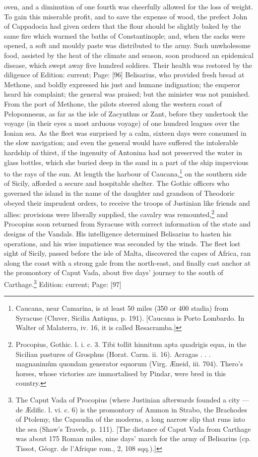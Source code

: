 oven, and a diminution of one fourth was cheerfully allowed for the loss of weight. To gain this miserable profit, and to save the expense of wood, the prefect John of Cappadocia had given orders that the flour should be slightly baked by the same fire which warmed the baths of Constantinople; and, when the sacks were opened, a soft and mouldy paste was distributed to the army. Such unwholesome food, assisted by the heat of the climate and season, soon produced an epidemical disease, which swept away five hundred soldiers. Their health was restored by the diligence of Edition: current; Page: [96] Belisarius, who provided fresh bread at Methone, and boldly expressed his just and humane indignation; the emperor heard his complaint; the general was praised; but the minister was not punished. From the port of Methone, the pilots steered along the western coast of Peloponnesus, as far as the isle of Zacynthus or Zant, before they undertook the voyage (in their eyes a most arduous voyage) of one hundred leagues over the Ionian sea. As the fleet was surprised by a calm, sixteen days were consumed in the slow navigation; and even the general would have suffered the intolerable hardship of thirst, if the ingenuity of Antonina had not preserved the water in glass bottles, which she buried deep in the sand in a part of the ship impervious to the rays of the sun. At length the harbour of Caucana,\footnote{Caucana, near Camarina, is at least 50 miles (350 or 400 stadia) from Syracuse (Cluver, Sicilia Antiqua, p. 191). [Caucana is Porto Lombardo. In Walter of Malaterra, iv. 16, it is called Resacramba.]} on the southern side of Sicily, afforded a secure and hospitable shelter. The Gothic officers who governed the island in the name of the daughter and grandson of Theodoric obeyed their imprudent orders, to receive the troops of Justinian like friends and allies: provisions were liberally supplied, the cavalry was remounted,\footnote{Procopius, Gothic. l. i. c. 3. Tibi tollit hinnitum apta quadrigis equa, in the Sicilian pastures of Grosphus (Horat. Carm. ii. 16). Acragas . . . magnanimûm quondam generator equorum (Virg. Æneid, iii. 704). Thero\texthebrew{}’s horses, whose victories are immortalised by Pindar, were bred in this country.} and Procopius soon returned from Syracuse with correct information of the state and designs of the Vandals. His intelligence determined Belisarius to hasten his operations, and his wise impatience was seconded by the winds. The fleet lost sight of Sicily, passed before the isle of Malta, discovered the capes of Africa, ran along the coast with a strong gale from the north-east, and finally cast anchor at the promontory of Caput Vada, about five days\texthebrew{}’ journey to the south of Carthage.\footnote{The Caput Vada of Procopius (where Justinian afterwards founded a city \texthebrew{—} de Ædific. l. vi. c. 6) is the promontory of Ammon in Strabo, the Brachodes of Ptolemy, the Capaudia of the moderns, a long narrow slip that runs into the sea (Shaw\texthebrew{}’s Travels, p. 111). [The distance of Caput Vada from Carthage was about 175 Roman miles, nine days\texthebrew{}’ march for the army of Belisarius (cp. Tissot, Géogr. de l\texthebrew{}’Afrique rom., 2, 108 sqq.).]}
Edition: current; Page: [97]


